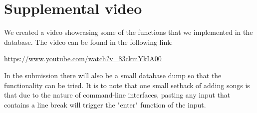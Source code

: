 \documentclass[a4paper,12pt]{article}
\begin{document}
\section{Supplemental video}

We created a video showcasing some of the functions that we implemented in the database. The video can be found in the following link:

\url{https://www.youtube.com/watch?v=83ckmYkIA00}

In the submission there will also be a small database dump so that the functionality can be tried. It is to note that one small setback of adding songs is that due to the nature of command-line interfaces, pasting any input that contains a line break will trigger the "enter" function of the input.
\end{document}
